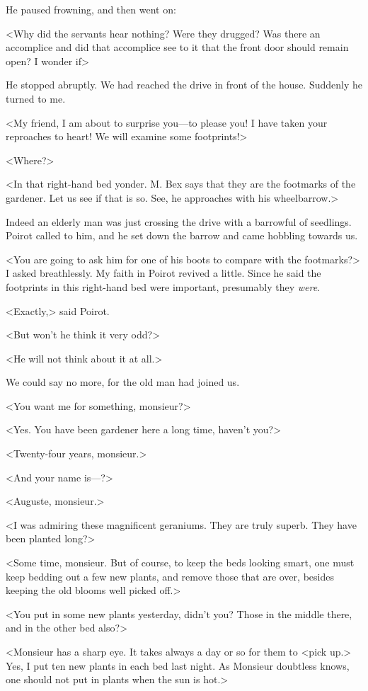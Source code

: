  He paused frowning, and then went on: 

 <Why did the servants hear nothing? Were they drugged? Was there an accomplice and did that accomplice see to it that the front door should remain open? I wonder if\longdash> 

 He stopped abruptly. We had reached the drive in front of the house. Suddenly he turned to me. 

 <My friend, I am about to surprise you—to please you! I have taken your reproaches to heart! We will examine some footprints!> 

 <Where?> 

 <In that right-hand bed yonder. M. Bex says that they are the footmarks of the gardener. Let us see if that is so. See, he approaches with his wheelbarrow.> 

 Indeed an elderly man was just crossing the drive with a barrowful of seedlings. Poirot called to him, and he set down the barrow and came hobbling towards us. 

 <You are going to ask him for one of his boots to compare with the footmarks?> I asked breathlessly. My faith in Poirot revived a little. Since he said the footprints in this right-hand bed were important, presumably they \emph{were}. 

 <Exactly,> said Poirot. 

 <But won't he think it very odd?> 

 <He will not think about it at all.> 

 We could say no more, for the old man had joined us. 

 <You want me for something, monsieur?> 

 <Yes. You have been gardener here a long time, haven't you?> 

 <Twenty-four years, monsieur.> 

 <And your name is—?> 

 <Auguste, monsieur.> 

 <I was admiring these magnificent geraniums. They are truly superb. They have been planted long?> 

 <Some time, monsieur. But of course, to keep the beds looking smart, one must keep bedding out a few new plants, and remove those that are over, besides keeping the old blooms well picked off.> 

 <You put in some new plants yesterday, didn't you? Those in the middle there, and in the other bed also?> 

 <Monsieur has a sharp eye. It takes always a day or so for them to <pick up.> Yes, I put ten new plants in each bed last night. As Monsieur doubtless knows, one should not put in plants when the sun is hot.> 


